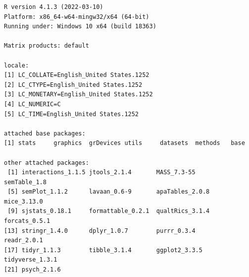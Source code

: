 \documentclass[
]{book}
\begin{document}
\begin{verbatim}
R version 4.1.3 (2022-03-10)
Platform: x86_64-w64-mingw32/x64 (64-bit)
Running under: Windows 10 x64 (build 18363)

Matrix products: default

locale:
[1] LC_COLLATE=English_United States.1252 
[2] LC_CTYPE=English_United States.1252   
[3] LC_MONETARY=English_United States.1252
[4] LC_NUMERIC=C                          
[5] LC_TIME=English_United States.1252    

attached base packages:
[1] stats     graphics  grDevices utils     datasets  methods   base     

other attached packages:
 [1] interactions_1.1.5 jtools_2.1.4       MASS_7.3-55        semTable_1.8      
 [5] semPlot_1.1.2      lavaan_0.6-9       apaTables_2.0.8    mice_3.13.0       
 [9] sjstats_0.18.1     formattable_0.2.1  qualtRics_3.1.4    forcats_0.5.1     
[13] stringr_1.4.0      dplyr_1.0.7        purrr_0.3.4        readr_2.0.1       
[17] tidyr_1.1.3        tibble_3.1.4       ggplot2_3.3.5      tidyverse_1.3.1   
[21] psych_2.1.6       


\end{verbatim}
\end{document}

